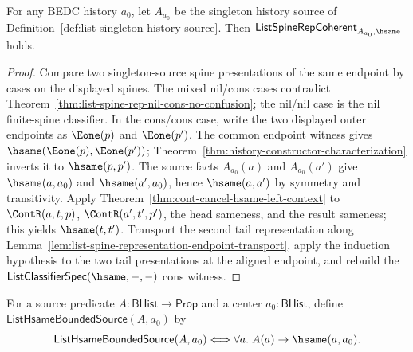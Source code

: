 \begin{theorem}
\label{thm:list-singleton-source-spine-coherence}
For any BEDC history $a_0$, let $A_{a_0}$ be the singleton history source of
Definition~\ref{def:list-singleton-history-source}. Then
$\mathsf{ListSpineRepCoherent}_{A_{a_0},\hsame}$ holds.
\end{theorem}
\begin{proof}
Compare two singleton-source spine presentations of the same endpoint by cases
on the displayed spines. The mixed nil/cons cases contradict
Theorem~\ref{thm:list-spine-rep-nil-cons-no-confusion}; the nil/nil case is the nil finite-spine classifier. In the cons/cons case, write the two displayed
outer endpoints as $\Eone(p)$ and $\Eone(p')$. The common endpoint witness gives
$\hsame(\Eone(p),\Eone(p'))$; Theorem~\ref{thm:history-constructor-characterization}
inverts it to $\hsame(p,p')$. The source facts $A_{a_0}(a)$ and $A_{a_0}(a')$
give $\hsame(a,a_0)$ and $\hsame(a',a_0)$, hence $\hsame(a,a')$ by symmetry and
transitivity. Apply Theorem~\ref{thm:cont-cancel-hsame-left-context} to
$\ContR(a,t,p)$, $\ContR(a',t',p')$, the head sameness, and the result sameness;
this yields $\hsame(t,t')$. Transport the second tail representation along
Lemma~\ref{lem:list-spine-representation-endpoint-transport}, apply the
induction hypothesis to the two tail presentations at the aligned endpoint, and
rebuild the $\mathsf{ListClassifierSpec}(\hsame,-,-)$ cons witness.
\end{proof}

\begin{definition}
\label{def:list-hsame-bounded-source}
For a source predicate $A:\mathsf{BHist}\to\mathsf{Prop}$ and a center
$a_0:\mathsf{BHist}$, define
$\mathsf{ListHsameBoundedSource}(A,a_0)$ by
$$
\mathsf{ListHsameBoundedSource}(A,a_0)
\Longleftrightarrow
\forall a.\; A(a)\to\hsame(a,a_0).
$$
\end{definition}

